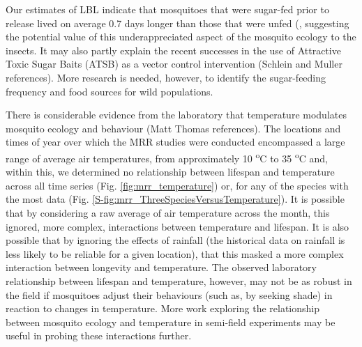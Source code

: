 \documentclass[]{article}
\begin{document}
Our estimates of LBL indicate that mosquitoes that were sugar-fed prior
to release lived on average 0.7 days longer than those that were unfed
(, suggesting the potential value of this underappreciated aspect of the
mosquito ecology to the insects. It may also partly explain the recent
successes in the use of Attractive Toxic Sugar Baits (ATSB) as a vector
control intervention (Schlein and Muller references). More research is
needed, however, to identify the sugar-feeding frequency and food
sources for wild populations.

There is considerable evidence from the laboratory that temperature
modulates mosquito ecology and behaviour (Matt Thomas references). The
locations and times of year over which the MRR studies were conducted
encompassed a large range of average air temperatures, from
approximately 10 \textsuperscript{o}C to 35 \textsuperscript{o}C and,
within this, we determined no relationship between lifespan and
temperature across all time series (Fig. \ref{fig:mrr_temperature}) or, for any of the species
with the most data (Fig. \ref{S-fig:mrr_ThreeSpeciesVersusTemperature}). It is possible that by considering a raw
average of air temperature across the month, this ignored, more complex, interactions between temperature and lifespan. It is also possible that by ignoring the effects of
rainfall (the historical data on rainfall is less likely to be reliable
for a given location), that this masked a more complex interaction
between longevity and temperature. The observed laboratory relationship
between lifespan and temperature, however, may not be as robust in the
field if mosquitoes adjust their behaviours (such as, by seeking shade)
in reaction to changes in temperature. More work exploring the
relationship between mosquito ecology and temperature in semi-field
experiments may be useful in probing these interactions further.
\end{document}
